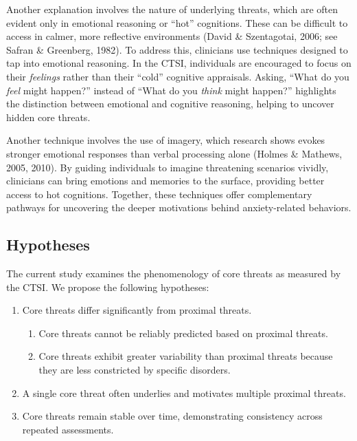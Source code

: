 \documentclass[
  man,floatsintext]{apa7}
\providecommand{\tightlist}{%
  \setlength{\itemsep}{0pt}\setlength{\parskip}{0pt}}
\begin{document}
Another explanation involves the nature of underlying threats, which are often evident only in emotional reasoning or ``hot'' cognitions.
These can be difficult to access in calmer, more reflective environments (David \& Szentagotai, 2006; see Safran \& Greenberg, 1982).
To address this, clinicians use techniques designed to tap into emotional reasoning.
In the CTSI, individuals are encouraged to focus on their \emph{feelings} rather than their ``cold'' cognitive appraisals.
Asking, ``What do you \emph{feel} might happen?'' instead of ``What do you \emph{think} might happen?'' highlights the distinction between emotional and cognitive reasoning, helping to uncover hidden core threats.

Another technique involves the use of imagery, which research shows evokes stronger emotional responses than verbal processing alone (Holmes \& Mathews, 2005, 2010).
By guiding individuals to imagine threatening scenarios vividly, clinicians can bring emotions and memories to the surface, providing better access to hot cognitions.
Together, these techniques offer complementary pathways for uncovering the deeper motivations behind anxiety-related behaviors.

\subsection{Hypotheses}\label{hypotheses}

The current study examines the phenomenology of core threats as measured by the CTSI.
We propose the following hypotheses:

\begin{enumerate}
\def\labelenumi{\arabic{enumi}.}
\tightlist
\item
  Core threats differ significantly from proximal threats.

  \begin{enumerate}
  \def\labelenumii{\alph{enumii}.}
  \tightlist
  \item
    Core threats cannot be reliably predicted based on proximal threats.
  \item
    Core threats exhibit greater variability than proximal threats because they are less constricted by specific disorders.
  \end{enumerate}
\item
  A single core threat often underlies and motivates multiple proximal threats.
\item
  Core threats remain stable over time, demonstrating consistency across repeated assessments.
\end{enumerate}
\end{document}

